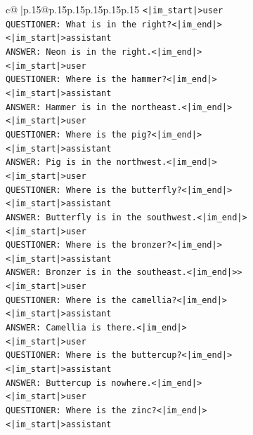 \documentclass{article}
\begin{document}
{\begin{supertabular}{c@{$\;$}|p{.15\linewidth}@{}p{.15\linewidth}p{.15\linewidth}p{.15\linewidth}p{.15\linewidth}p{.15\linewidth}}
{{{\texttt{<|im\_start|>user} \\
\texttt{QUESTIONER: What is in the right?<|im\_end|>} \\
\texttt{<|im\_start|>assistant} \\
\texttt{ANSWER: Neon is in the right.<|im\_end|>} \\
\texttt{<|im\_start|>user} \\
\texttt{QUESTIONER: Where is the hammer?<|im\_end|>} \\
\texttt{<|im\_start|>assistant} \\
\texttt{ANSWER: Hammer is in the northeast.<|im\_end|>} \\
\texttt{<|im\_start|>user} \\
\texttt{QUESTIONER: Where is the pig?<|im\_end|>} \\
\texttt{<|im\_start|>assistant} \\
\texttt{ANSWER: Pig is in the northwest.<|im\_end|>} \\
\texttt{<|im\_start|>user} \\
\texttt{QUESTIONER: Where is the butterfly?<|im\_end|>} \\
\texttt{<|im\_start|>assistant} \\
\texttt{ANSWER: Butterfly is in the southwest.<|im\_end|>} \\
\texttt{<|im\_start|>user} \\
\texttt{QUESTIONER: Where is the bronzer?<|im\_end|>} \\
\texttt{<|im\_start|>assistant} \\
\texttt{ANSWER: Bronzer is in the southeast.<|im\_end|>>} \\
\texttt{<|im\_start|>user} \\
\texttt{QUESTIONER: Where is the camellia?<|im\_end|>} \\
\texttt{<|im\_start|>assistant} \\
\texttt{ANSWER: Camellia is there.<|im\_end|>} \\
\texttt{<|im\_start|>user} \\
\texttt{QUESTIONER: Where is the buttercup?<|im\_end|>} \\
\texttt{<|im\_start|>assistant} \\
\texttt{ANSWER: Buttercup is nowhere.<|im\_end|>} \\
\texttt{<|im\_start|>user} \\
\texttt{QUESTIONER: Where is the zinc?<|im\_end|>} \\
\texttt{<|im\_start|>assistant} \\
}}}
\end{supertabular}}
\end{document}
